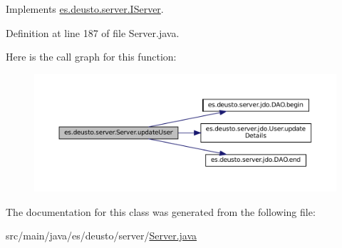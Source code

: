 Implements \mbox{\hyperlink{interfacees_1_1deusto_1_1server_1_1_i_server_aff376200af975b145ac85ccfdf48a229}{es.\+deusto.\+server.\+I\+Server}}.



Definition at line 187 of file Server.\+java.

Here is the call graph for this function\+:
\nopagebreak
\begin{figure}[H]
\begin{center}
\leavevmode
\includegraphics[width=350pt]{classes_1_1deusto_1_1server_1_1_server_a74082f91af2065cd600c147296090921_cgraph}
\end{center}
\end{figure}


The documentation for this class was generated from the following file\+:\begin{DoxyCompactItemize}
\item 
src/main/java/es/deusto/server/\mbox{\hyperlink{_server_8java}{Server.\+java}}\end{DoxyCompactItemize}
